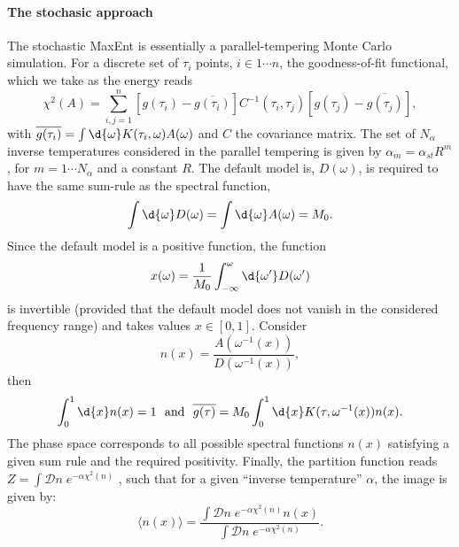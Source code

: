 \paragraph*{The stochasic approach}
The stochastic MaxEnt is essentially a parallel-tempering Monte Carlo simulation.  For a discrete set 
of $\tau_i$ points,  $i \in 1 \cdots n $, the goodness-of-fit functional, which we take as the energy reads
\begin{equation}
  \chi^{2}(A) =  \sum_{i,j=1}^{n}   \left[ g(\tau_i)  -  \overline{g(\tau_i)} \right] C^{-1}(\tau_i,\tau_j) \left[    g(\tau_j)  -  \overline{g(\tau_j)} \right] ,
\end{equation}
with $ \overline{g(\tau_i)} =\int \d{\omega} K(\tau_{i},\omega)  A(\omega)$ and  $C$ the covariance matrix. 
The set of $N_{\alpha}$ inverse temperatures considered in the parallel tempering is given by
$ \alpha_m = \alpha_{st}  R^{m}$, for $m = 1 \cdots N_{\alpha} $ and a constant $R$.
The  default model  is, $D(\omega)$,  is   required  to  have  the  same  sum-rule  as  the  spectral  function,
\begin{equation}
  \int \d{\omega} D(\omega) =  \int \d{\omega} A(\omega) =  M_0. 
\end{equation}
Since   the    default  model is  a  positive    function,  the    function 
\begin{equation}
     x(\omega)  =   \frac{1}{M_0}\int_{-\infty}^{\omega} \d{\omega'}  D(\omega')  
\end{equation}
is  invertible  (provided  that  the  default model  does not  vanish  in the considered frequency  range) 
and   takes  values  $ x \in \left[ 0,1 \right] $. Consider 
\begin{equation}
      n(x)   =  \frac{A(\omega^{-1}(x))}{D(\omega^{-1}(x))},
\end{equation}
then 
\begin{equation}
    \int_{0}^{1} \d{x} n(x)  = 1   \, \,  \text{ and } \, \,  
    \overline{g(\tau)} = M_0 \int_{0}^{1} \d{x} K(\tau,\omega^{-1}(x))  n(x).
\end{equation}
The phase space corresponds to 
all possible spectral functions $n(x)$ satisfying a given sum rule and the required positivity. 
 Finally, the partition function reads
$Z =  \int\mathcal{D}\!n\; e^{-\alpha \chi^{2}(n)}$ \cite{Beach04a}, such that for a given ``inverse temperature'' $\alpha$, the image is given by: 
\begin{equation}
  \label{eqn:Stoch_MaxEnt}
  \langle n (x ) \rangle  =   \frac{\int\mathcal{D}\!n\; e^{-\alpha \chi^{2}(n)}  n(x) }
         { \int\mathcal{D}\!n\; e^{-\alpha \chi^{2}(n)}  }.
\end{equation}
